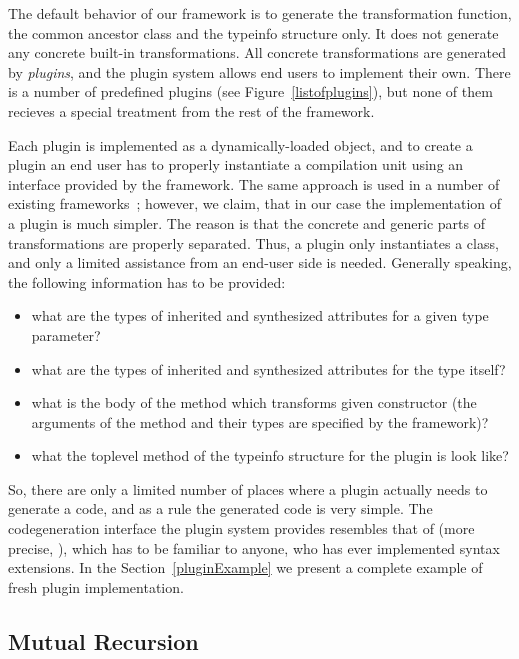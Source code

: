The default behavior of our framework is to generate the transformation function, the common ancestor class and the typeinfo structure only. It does not
generate any concrete built-in transformations. All concrete transformations are generated by \emph{plugins}, and the plugin system allows end users to
implement their own. There is a number of predefined plugins (see Figure~\ref{listofplugins}), but none of them recieves a special treatment from the
rest of the framework.

Each plugin is implemented as a dynamically-loaded object, and to create a plugin an end user has to properly instantiate a compilation unit using an interface
provided by the framework. The same approach is used in a number of existing frameworks~\cite{PPXLib,Yallop}; however, we claim, that in our case the
implementation of a plugin is much simpler. The reason is that the concrete and generic parts of transformations are properly separated. Thus,
a plugin only instantiates a class, and only a limited assistance from an end-user side is needed. Generally speaking, the following information has to be
provided:

\begin{itemize}
\item what are the types of inherited and synthesized attributes for a given type parameter?
\item what are the types of inherited and synthesized attributes for the type itself?
\item what is the body of the method which transforms given constructor (the arguments of the method and their types are specified by the framework)?
\item what the toplevel method of the typeinfo structure for the plugin is look like?
\end{itemize}

So, there are only a limited number of places where a plugin actually needs to generate a code, and as a rule the generated code is very simple. The
codegeneration interface the plugin system provides resembles that of  (more precise, ), which has to be familiar to anyone,
who has ever implemented syntax extensions. In the Section~\ref{pluginExample} we present a complete example of fresh plugin implementation.

\subsection{Mutual Recursion}
\label{murec}

